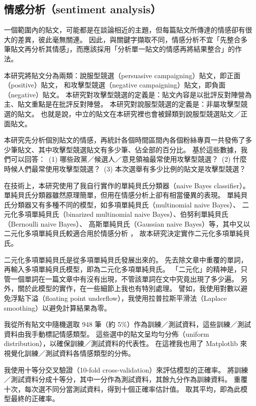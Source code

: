 \documentclass[a4paper, 10pt, conference]{ieeeconf}       %
\begin{document}
\begin{CJK}{UTF8}{bsmi}
\subsection*{情感分析（sentiment analysis）}

一個範圍內的貼文，可能都是在談論相近的主題，但每篇貼文所傳達的情感卻有很大的差異，彼此毫無關連。%
因此，與關鍵字擷取不同，情感分析不宜「先整合多筆貼文再分析其情感」，而應該採用「分析單一貼文的情感再將結果整合」的作法。%

本研究將貼文分為兩類：說服型競選（persuasive campaigning）貼文，即正面（positive）貼文，%
和攻擊型競選（negative campaigning）貼文，即負面（negative）貼文。%
本研究對攻擊型競選的定義是：貼文內容是以批評反對陣營為主、貼文重點是在批評反對陣營。%
本研究對說服型競選的定義是：非屬攻擊型競選的貼文。%
也就是說，中立的貼文在本研究裡也會被歸類到說服型競選貼文／正面貼文。%

本研究先分析個別貼文的情感，再統計各個時間區間內各個粉絲專頁一共發佈了多少筆貼文、其中攻擊型競選貼文有多少筆、佔全部的百分比。%
基於這些數據，我們可以回答：%
\,(1) 哪些政黨／候選人／意見領袖最常使用攻擊型競選？%
\,(2) 什麼時候人們最常使用攻擊型競選？%
\,(3) 本次選舉有多少比例的貼文是攻擊型競選？%

在技術上，本研究使用了我自行實作的單純貝氏分類器（naive Bayes classifier）\cite{c13}。%
單純貝氏分類器雖然原理簡單，但用在情感分析上卻有相當優異的表現。%
單純貝氏分類器又有多種不同的模型，如多項單純貝氏（multinomial naive Bayes）、%
二元化多項單純貝氏（binarized multinomial naive Bayes）、伯努利單純貝氏（Bernoulli naive Bayes）、%
高斯單純貝氏（Gaussian naive Bayes）等，其中又以二元化多項單純貝氏較適合用於情感分析 \cite{c14}，%
故本研究決定實作二元化多項單純貝氏。%

二元化多項單純貝氏是從多項單純貝氏發展出來的。%
先去除文章中重覆的單詞，再輸入多項單純貝氏模型，即為二元化多項單純貝氏。%
「二元化」的精神是，只管一個單詞在一篇文章中有沒有出現，不管該單詞在文中究竟出現了多少遍。%
另外，關於此模型的實作，在一些細節上我也有特別處理。%
譬如，我使用對數以避免浮點下溢（floating point underflow），我使用拉普拉斯平滑法（Laplace smoothing）以避免計算結果為零。%

我從所有貼文中隨機選取 948 筆（約 5\%）作為訓練／測試資料，這些訓練／測試資料由我手動標記情感類型。%
這些選中的貼文呈均勻分佈（uniform distribution），以確保訓練／測試資料的代表性。%
在這裡我也用了 Matplotlib 來視覺化訓練／測試資料各情感類型的分佈。%

我使用十等分交叉驗證（10-fold cross-validation）來評估模型的正確率。%
將訓練／測試資料分成十等分，其中一分作為測試資料，其餘九分作為訓練資料。%
重覆十次，每次選不同分當測試資料，得到十個正確率估計值。%
取其平均，即為此模型最終的正確率。%


\end{CJK}
\end{document}
